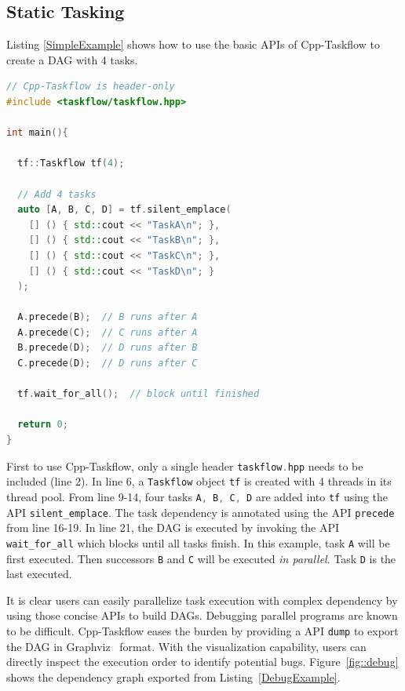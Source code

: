 \documentclass[sigconf]{acmart}
\def\codeinline{\lstinline[basicstyle=\small\color{darkgray},language=C++]}
\begin{document}
\subsection{Static Tasking}
Listing \ref{SimpleExample} shows how to use the basic APIs of Cpp-Taskflow to create a DAG with 4 tasks.

\begin{lstlisting}[language=C++,label=SimpleExample,caption={A simple example.}]
// Cpp-Taskflow is header-only
#include <taskflow/taskflow.hpp>  

int main(){
  
  tf::Taskflow tf(4);

  // Add 4 tasks
  auto [A, B, C, D] = tf.silent_emplace(
    [] () { std::cout << "TaskA\n"; },               
    [] () { std::cout << "TaskB\n"; },               
    [] () { std::cout << "TaskC\n"; },               
    [] () { std::cout << "TaskD\n"; }                
  );                                                 
                                                     
  A.precede(B);  // B runs after A                   
  A.precede(C);  // C runs after A                   
  B.precede(D);  // D runs after B                   
  C.precede(D);  // D runs after C                   
                                                     
  tf.wait_for_all();  // block until finished

  return 0;
}
\end{lstlisting} 

First to use Cpp-Taskflow, only a single header \codeinline{taskflow.hpp} needs
to be included (line 2).  In line 6, a \codeinline{Taskflow} object
\codeinline{tf} is created with 4 threads in its thread pool. From line 9-14,
four tasks \codeinline{A, B, C, D} are added into \codeinline{tf} using the API
\codeinline{silent_emplace}.  The task dependency is annotated using the API
\codeinline{precede} from line 16-19. In line 21, the DAG is executed by
invoking the API \codeinline{wait_for_all} which blocks until all tasks finish.
In this example, task \codeinline{A} will be first executed. Then  successors
\codeinline{B} and \codeinline{C} will be executed \emph{in parallel}. Task
\codeinline{D} is the last executed.

It is clear users can easily parallelize task execution with complex dependency 
by using those concise APIs to build DAGs. Debugging parallel programs are known 
to be difficult. Cpp-Taskflow eases the burden by providing a API
\codeinline{dump} to export the DAG in Graphviz~\cite{graphviz} format. 
With the visualization capability, users can directly inspect the execution order 
to identify potential bugs.  Figure~\ref{fig::debug}
shows the dependency graph exported from Listing~\ref{DebugExample}.
\end{document}

